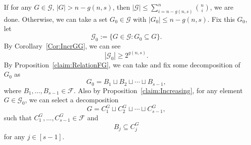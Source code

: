 \documentclass[11pt]{article}
\theoremstyle{definition}
\begin{document}
If for any \(G\in\mathcal{G}\), \(|G|> n-g(n,s)\), then \(|\mathcal{G}|\le\sum\limits_{i=n-g(n,s)}^{n}\binom{n}{i} \), we are done. Otherwise, we can take a set \(G_{0}\in\mathcal{G}\) with \(|G_{0}|\le n-g(n,s)\).  Fix this \(G_{0}\), let
\[
\mathcal{G}_{0}:=\{G\in\mathcal{G}:G_{0}\subseteq G\}.
\]
By Corollary~\ref{Cor:IncrGG}, we can see
\[
|\mathcal{G}_{0}|\ge 2^{g(n,s)}.
\]
By Proposition~\ref{claim:RelationFG}, we can take and fix some decomposition of \(G_{0}\) as 
\[
G_{0}=B_{1}\sqcup B_{2}\sqcup\cdots\sqcup B_{s-1},
\]
where \(B_{1},\ldots,B_{s-1}\in\mathcal{F}\). Also by Proposition~\ref{claim:Increasing}, for any element \(G\in \mathcal{G}_{0}\), we can select a decomposition 
\[
G=C_{1}^{G}\sqcup C_{2}^{G}\sqcup\cdots\sqcup C_{s-1}^{G},
\]
such that \(C_{1}^{G},\ldots,C_{s-1}^{G}\in\mathcal{F}\) and
\begin{equation}\label{containment:BjCj}
    B_{j}\subseteq C_{j}^{G}
\end{equation}
for any \(j\in [s-1].\)
\end{document}
